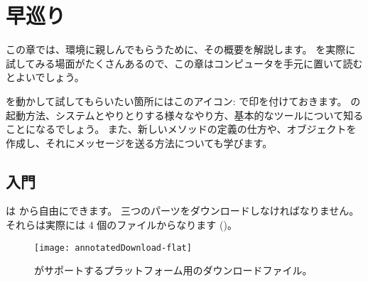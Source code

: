 \documentclass[a4paper,10pt,twoside]{book}
\begin{document}
	\sloppy
\fi
\newcommand{\clover}{%
	\raisebox{-0.8ex}[0pt][0pt]{%
		\texttt{[image: cloverleafKey]}}}
\chapter{\pharo 早巡り}

この章では、\pharo 環境に親しんでもらうために、その概要を解説します。
\pharo を実際に試してみる場面がたくさんあるので、この章はコンピュータを手元に置いて読むとよいでしょう。

\pharo を動かして試してもらいたい箇所にはこのアイコン: \dothisicon{} で印を付けておきます。
\pharo の起動方法、システムとやりとりする様々なやり方、基本的なツールについて知ることになるでしょう。
また、新しいメソッドの定義の仕方や、オブジェクトを作成し、それにメッセージを送る方法についても学びます。

\section{入門}

\pharo は \pharoweb から自由にできます。
三つのパーツをダウンロードしなければなりません。それらは実際には 4 個のファイルからなります ()。

\begin{figure}[htb]
\centerline {\texttt{[image: annotatedDownload-flat]}}
\caption{\pharo がサポートするプラットフォーム用のダウンロードファイル。}
\end{figure}
\end{document}
